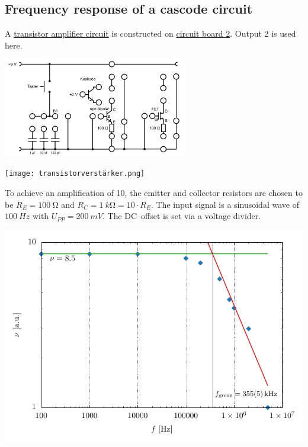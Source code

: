 \documentclass[a4paper,10pt]{article}
\newenvironment{Figure}
  {\par\medskip\noindent\minipage{\linewidth}}
  {\endminipage\par\medskip} %
\numberwithin{equation}{section}
\begin{document}
\begin{multicols}{2}
        \subsection{Frequency response of a cascode circuit}
        A \hyperref[fig:transistorverstärker]{transistor amplifier circuit} is constructed on \hyperref[fig:schaltbrett_2]{circuit board 2}.
        Output 2 is used here.
        \begin{Figure}
                \centering
                \includegraphics[width=0.6\textwidth]{schaltbrett_2.png}
                 \label{fig:schaltbrett_2}
        \end{Figure}
        \begin{Figure}
                \centering
                \texttt{[image: transistorverstärker.png]}
                 \label{fig:transistorverstärker}
        \end{Figure}
        To achieve an amplification of 10, the emitter and collector resistors are chosen to be $R_E=\SI{100}{\ohm}$ and $R_C=\SI{1}{k\ohm}=10\cdot R_E$.
        The input signal is a sinusoidal wave of $\SI{100}{Hz}$ with $U_{PP}=\SI{200}{mV}$.
        The DC--offset is set via a voltage divider.
        \begin{Figure}
                \centering
                \includegraphics[width=\textwidth]{../plot/ex4_crop.pdf}

\end{Figure}
\end{multicols}
\end{document}
